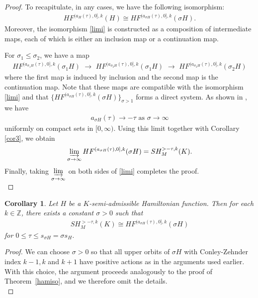 \documentclass[12pt]{amsart}
\newtheorem{corollary}[theorem]{Corollary}
\theoremstyle{definition}
\newcommand{\ZZ}{{\mathbb Z}}
\newcommand{\lr}{{\,\,\longrightarrow\,\,}}
\begin{document}
\begin{proof}
\vspace{0.2cm}

 To recapitulate, in any cases, we have the following isomorphism:
\begin{align}\label{limi}
    HF^{(a_H(\tau),0],k}(H) \cong HF^{(a_{\sigma H}(\tau),0],k}(\sigma H).
\end{align}
Moreover, the isomorphism \eqref{limi} is constructed as a composition of intermediate maps, each of which is either an inclusion map or a continuation map.

\vspace{0.2 cm}

For $\sigma_1 \leq \sigma_2$, we have a map
\begin{align*}
    HF^{(a_{\sigma_1H}(\tau),0],k}(\sigma_1H) \lr HF^{(a_{\sigma_2H}(\tau),0],k}(\sigma_1H) \lr HF^{(a_{\sigma_2H}(\tau),0],k}(\sigma_2H) 
\end{align*}
where the first map is induced by inclusion and the second map is the continuation map. Note that these maps are compatible with the isomorphism \eqref{limi} and that $\{ HF^{(a_{\sigma H}(\tau),0],k}(\sigma H)\}_{\sigma>1}$ forms a direct system.  As shown in \cite{cggm2}, we have
\begin{align*}
    a_{\sigma H}(\tau) \to -\tau \,\,\textrm{as}\,\,\sigma \to \infty
\end{align*}
uniformly on compact sets in $[0, \infty)$. Using this limit together with Corollary \ref{cor3}, we obtain
\begin{align*}
    \varinjlim_{\sigma \to \infty}HF^{(a_{\sigma H}(\tau),0],k}(\sigma H) = SH^{>-\tau,k}_M(K). 
\end{align*}
Finally, taking $\displaystyle\varinjlim_{\sigma \to \infty}$ on both sides of \eqref{limi} completes the proof.\\
\end{proof}
\begin{corollary}\label{hamisocoro}
    Let $H$ be a $K$-semi-admissible Hamiltonian function. Then for each $k \in \ZZ$, there exists a constant $\sigma >0$ such that
    \begin{align*}
        SH^{>-\tau,k}_M(K) \cong HF^{(a_{\sigma H}(\tau),0],k}(\sigma H)
    \end{align*}
    for $0 \leq \tau \leq s_{\sigma H} = \sigma s_H$.
\end{corollary}
\begin{proof}
We can choose $\sigma >0$ so that all upper orbits of $\sigma H$ with Conley-Zehnder index $k-1,k$ and $k+1$ have positive actions as in the arguments used earlier. With this choice, the argument proceeds analogously to the proof of Theorem~\ref{hamiso}, and we therefore omit the details.\\    
\end{proof}
\end{document}
